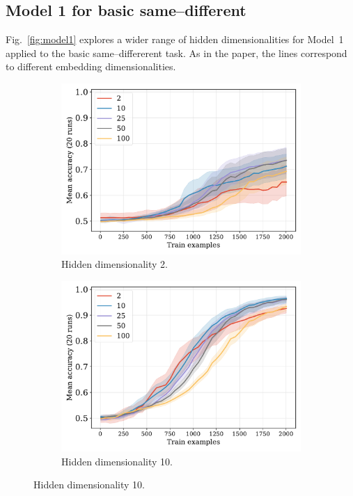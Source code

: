 \documentclass[12pt]{article}
\newcommand{\Figref}[1]{Fig.~\ref{#1}}
\begin{document}

\subsection{Model 1 for basic same--different}

\Figref{fig:model1} explores a wider range of hidden dimensionalities for Model~1 applied to the basic same--differerent task. As in the paper, the lines correspond to different embedding dimensionalities.

\begin{figure}[H]
  \centering

  \begin{subfigure}{0.45\linewidth}
    \includegraphics[width=1\textwidth]{fig/equality-small-train_size-embed_dim-hidden_dim=2.pdf}
    \caption{Hidden dimensionality 2.}
  \end{subfigure}
  \hfill
  \begin{subfigure}{0.45\linewidth}
    \includegraphics[width=1\textwidth]{fig/equality-small-train_size-embed_dim-hidden_dim=10.pdf}
    \caption{Hidden dimensionality 10.}
  \end{subfigure}


\end{figure}
\end{document}
